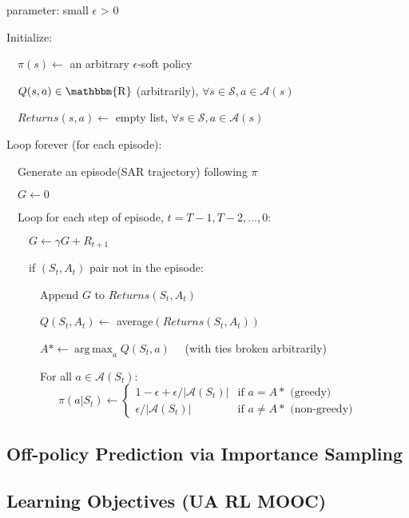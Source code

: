 \documentclass[lang=en,mode=geye,device=normal,color=blue,14pt]{elegantnote}
\DeclareMathOperator*{\1}{\mathbbm{1}}
\DeclareMathOperator*{\R}{\mathbbm{R}}
\DeclareMathOperator*{\argmax}{arg\,max}
\begin{document}
\begin{tcolorbox}[width=1.1\textwidth,title={On-policy first-visit MC control, estimates $V \approx v_\pi$}]
parameter: small $\epsilon$ > 0

Initialize:

$\quad \pi(s) \leftarrow$ an arbitrary $\epsilon$-soft policy

$\quad Q(s,a) \in \R$ (arbitrarily), $\forall s \in \mathcal{S}, a \in \mathcal{A}(s)$

$\quad Returns(s,a) \leftarrow$ empty list, $\forall s \in \mathcal{S}, a \in \mathcal{A}(s)$

Loop forever (for each episode):

$\quad$Generate an episode(SAR trajectory) following $\pi$

$\quad G \leftarrow 0$

$\quad$Loop for each step of episode, $t = T-1, T-2, ..., 0$:

$\quad\quad G\leftarrow \gamma G + R_{t+1}$

$\quad\quad$if $(S_t, A_t)$ pair not in the episode:

$\quad\quad\quad$Append $G$ to $Returns(S_t, A_t)$

$\quad\quad\quad Q(S_t, A_t) \leftarrow$ average$(Returns(S_t, A_t))$

$\quad\quad\quad A* \leftarrow \argmax_a Q(S_t, a) \quad$ (with ties broken arbitrarily)

$\quad\quad\quad$For all $a \in \mathcal{A}(S_t):$
$\quad\quad\quad\quad$ \begin{equation}
  \pi(a|S_t) \leftarrow
    \begin{cases}
      1 - \epsilon + \epsilon / |\mathcal{A}(S_t)| & \text{if $a = A*$ (greedy)}\\
      \epsilon / |\mathcal{A}(S_t)| & \text{if $a \neq A*$ (non-greedy)}
    \end{cases}       
\end{equation}

\end{tcolorbox}

\subsection{Off-policy Prediction via Importance Sampling}


\subsection{Learning Objectives (UA RL MOOC)}
\end{document}
